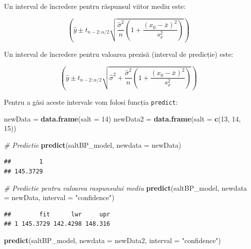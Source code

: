 \documentclass[]{article}
\newenvironment{Shaded}{\begin{snugshade}}{\end{snugshade}}
\newcommand{\KeywordTok}[1]{\textcolor[rgb]{0.13,0.29,0.53}{\textbf{{#1}}}}
\newcommand{\DataTypeTok}[1]{\textcolor[rgb]{0.13,0.29,0.53}{{#1}}}
\newcommand{\DecValTok}[1]{\textcolor[rgb]{0.00,0.00,0.81}{{#1}}}
\newcommand{\StringTok}[1]{\textcolor[rgb]{0.31,0.60,0.02}{{#1}}}
\newcommand{\CommentTok}[1]{\textcolor[rgb]{0.56,0.35,0.01}{\textit{{#1}}}}
\newcommand{\NormalTok}[1]{{#1}}
\begin{document}
Un interval de încredere pentru răspunsul viitor mediu este:

\[
\left(\hat y \pm t_{n-2:\alpha/2}\sqrt{\frac{\hat\sigma^2}{n}\left(1+\frac{(x_0-\bar x)^2}{s_x^2}\right)}\right)
\]

Un interval de încredere pentru valoarea prezisă (interval de predicție)
este:

\[
\left(\hat y \pm t_{n-2:\alpha/2}\sqrt{\hat\sigma^2+\frac{\hat\sigma^2}{n}\left(1+\frac{(x_0-\bar x)^2}{s_x^2}\right)}\right)
\]

Pentru a găsi aceste intervale vom folosi funcția \texttt{predict}:

\begin{Shaded}
\begin{Highlighting}[]
\NormalTok{newData =}\StringTok{ }\KeywordTok{data.frame}\NormalTok{(}\DataTypeTok{salt =} \DecValTok{14}\NormalTok{)}
\NormalTok{newData2 =}\StringTok{ }\KeywordTok{data.frame}\NormalTok{(}\DataTypeTok{salt =} \KeywordTok{c}\NormalTok{(}\DecValTok{13}\NormalTok{, }\DecValTok{14}\NormalTok{, }\DecValTok{15}\NormalTok{))}

\CommentTok{# Predictie}
\KeywordTok{predict}\NormalTok{(saltBP_model, }\DataTypeTok{newdata =} \NormalTok{newData)}
\end{Highlighting}
\end{Shaded}

\begin{verbatim}
##        1 
## 145.3729
\end{verbatim}

\begin{Shaded}
\begin{Highlighting}[]
\CommentTok{# Predictie pentru valoarea raspunsului mediu}
\KeywordTok{predict}\NormalTok{(saltBP_model, }\DataTypeTok{newdata =} \NormalTok{newData, }\DataTypeTok{interval =} \StringTok{"confidence"}\NormalTok{)}
\end{Highlighting}
\end{Shaded}

\begin{verbatim}
##        fit      lwr     upr
## 1 145.3729 142.4298 148.316
\end{verbatim}

\begin{Shaded}
\begin{Highlighting}[]
\KeywordTok{predict}\NormalTok{(saltBP_model, }\DataTypeTok{newdata =} \NormalTok{newData2, }\DataTypeTok{interval =} \StringTok{"confidence"}\NormalTok{)}
\end{Highlighting}
\end{Shaded}
\end{document}
